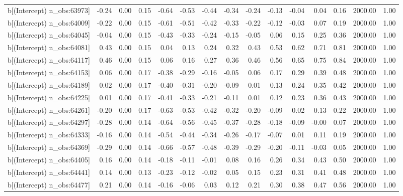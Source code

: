 \begin{table}[ht]
\begin{tabular}{rrrrrrrrrrrrrrr}
  b[(Intercept) n\_obs:63973] & -0.24 & 0.00 & 0.15 & -0.64 & -0.53 & -0.44 & -0.34 & -0.24 & -0.13 & -0.04 & 0.04 & 0.16 & 2000.00 & 1.00 \\ 
  b[(Intercept) n\_obs:64009] & -0.22 & 0.00 & 0.15 & -0.61 & -0.51 & -0.42 & -0.33 & -0.22 & -0.12 & -0.03 & 0.07 & 0.19 & 2000.00 & 1.00 \\ 
  b[(Intercept) n\_obs:64045] & -0.04 & 0.00 & 0.15 & -0.43 & -0.33 & -0.24 & -0.15 & -0.05 & 0.06 & 0.15 & 0.25 & 0.36 & 2000.00 & 1.00 \\ 
  b[(Intercept) n\_obs:64081] & 0.43 & 0.00 & 0.15 & 0.04 & 0.13 & 0.24 & 0.32 & 0.43 & 0.53 & 0.62 & 0.71 & 0.81 & 2000.00 & 1.00 \\ 
  b[(Intercept) n\_obs:64117] & 0.46 & 0.00 & 0.15 & 0.06 & 0.16 & 0.27 & 0.36 & 0.46 & 0.56 & 0.65 & 0.75 & 0.84 & 2000.00 & 1.00 \\ 
  b[(Intercept) n\_obs:64153] & 0.06 & 0.00 & 0.17 & -0.38 & -0.29 & -0.16 & -0.05 & 0.06 & 0.17 & 0.29 & 0.39 & 0.48 & 2000.00 & 1.00 \\ 
  b[(Intercept) n\_obs:64189] & 0.02 & 0.00 & 0.17 & -0.40 & -0.31 & -0.20 & -0.09 & 0.01 & 0.13 & 0.24 & 0.35 & 0.42 & 2000.00 & 1.00 \\ 
  b[(Intercept) n\_obs:64225] & 0.01 & 0.00 & 0.17 & -0.41 & -0.33 & -0.21 & -0.11 & 0.01 & 0.12 & 0.23 & 0.36 & 0.43 & 2000.00 & 1.00 \\ 
  b[(Intercept) n\_obs:64261] & -0.20 & 0.00 & 0.17 & -0.63 & -0.53 & -0.42 & -0.32 & -0.20 & -0.09 & 0.02 & 0.13 & 0.22 & 2000.00 & 1.00 \\ 
  b[(Intercept) n\_obs:64297] & -0.28 & 0.00 & 0.14 & -0.64 & -0.56 & -0.45 & -0.37 & -0.28 & -0.18 & -0.09 & -0.00 & 0.07 & 2000.00 & 1.00 \\ 
  b[(Intercept) n\_obs:64333] & -0.16 & 0.00 & 0.14 & -0.54 & -0.44 & -0.34 & -0.26 & -0.17 & -0.07 & 0.01 & 0.11 & 0.19 & 2000.00 & 1.00 \\ 
  b[(Intercept) n\_obs:64369] & -0.29 & 0.00 & 0.14 & -0.66 & -0.57 & -0.48 & -0.39 & -0.29 & -0.20 & -0.11 & -0.03 & 0.05 & 2000.00 & 1.00 \\ 
  b[(Intercept) n\_obs:64405] & 0.16 & 0.00 & 0.14 & -0.18 & -0.11 & -0.01 & 0.08 & 0.16 & 0.26 & 0.34 & 0.43 & 0.50 & 2000.00 & 1.00 \\ 
  b[(Intercept) n\_obs:64441] & 0.14 & 0.00 & 0.13 & -0.23 & -0.12 & -0.02 & 0.05 & 0.15 & 0.23 & 0.31 & 0.41 & 0.48 & 2000.00 & 1.00 \\ 
  b[(Intercept) n\_obs:64477] & 0.21 & 0.00 & 0.14 & -0.16 & -0.06 & 0.03 & 0.12 & 0.21 & 0.30 & 0.38 & 0.47 & 0.56 & 2000.00 & 1.00 \\ 

\end{tabular}
\end{table}
